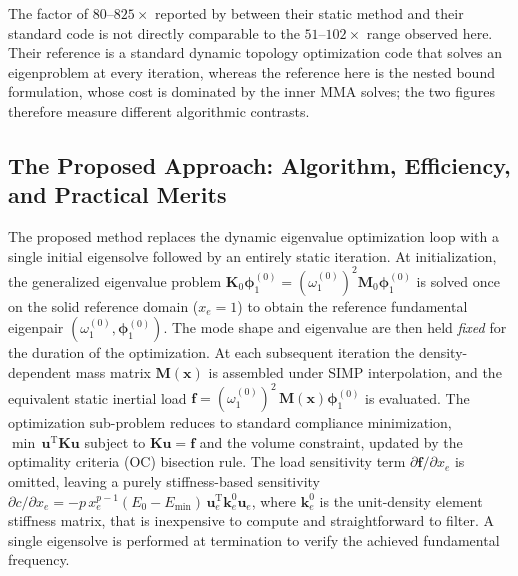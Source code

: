 \documentclass[applsci,article,submit,pdftex,moreauthors]{Definitions/mdpi}
\begin{document}
The factor of $80$--$825\times$ reported by \citet[Table~1]{YUKSEL2025} between their static method and their standard code is not directly comparable to the $51$--$102\times$ range observed here. Their reference is a standard dynamic topology optimization code that solves an eigenproblem at every iteration, whereas the reference here is the nested bound formulation, whose cost is dominated by the inner MMA solves; the two figures therefore measure different algorithmic contrasts.

\subsection{The Proposed Approach: Algorithm, Efficiency, and Practical Merits}

The proposed method replaces the dynamic eigenvalue optimization loop with a single initial eigensolve followed by an entirely static iteration. At initialization, the generalized eigenvalue problem $\mathbf{K}_0\boldsymbol{\phi}_1^{(0)} = (\omega_1^{(0)})^2\mathbf{M}_0\boldsymbol{\phi}_1^{(0)}$ is solved once on the solid reference domain ($x_e = 1$) to obtain the reference fundamental eigenpair $(\omega_1^{(0)},\boldsymbol{\phi}_1^{(0)})$. The mode shape and eigenvalue are then held \emph{fixed} for the duration of the optimization. At each subsequent iteration the density-dependent mass matrix $\mathbf{M}(\mathbf{x})$ is assembled under SIMP interpolation, and the equivalent static inertial load $\mathbf{f} = (\omega_1^{(0)})^2\,\mathbf{M}(\mathbf{x})\boldsymbol{\phi}_1^{(0)}$ is evaluated. The optimization sub-problem reduces to standard compliance minimization, $\min\,\mathbf{u}^\mathrm{T}\mathbf{K}\mathbf{u}$ subject to $\mathbf{K}\mathbf{u}=\mathbf{f}$ and the volume constraint, updated by the optimality criteria (OC) bisection rule. The load sensitivity term $\partial\mathbf{f}/\partial x_e$ is omitted, leaving a purely stiffness-based sensitivity $\partial c/\partial x_e = -p\,x_e^{p-1}(E_0 - E_\mathrm{min})\,\mathbf{u}_e^\mathrm{T}\mathbf{k}_e^0\mathbf{u}_e$, where $\mathbf{k}_e^0$ is the unit-density element stiffness matrix, that is inexpensive to compute and straightforward to filter. A single eigensolve is performed at termination to verify the achieved fundamental frequency.
\end{document}
